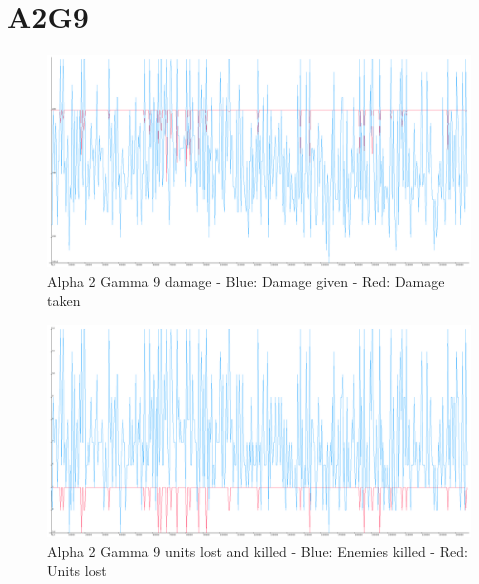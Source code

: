 \section{A2G9}
\begin{figure}[H]
\includegraphics[angle=-90, scale=0.25]{Figures/learningrate/A2G9/damage.png}
\caption{Alpha 2 Gamma 9 damage - Blue: Damage given - Red: Damage taken}
\label{fig:app_a2g9_damage}
\end{figure}	

\begin{figure}[H]
\includegraphics[angle=-90, scale=0.25]{Figures/learningrate/A2G9/units_lost_and_units_killed.png}
\caption{Alpha 2 Gamma 9 units lost and killed - Blue: Enemies killed - Red: Units lost}
\label{fig:app_a2g9_lak}
\end{figure}

